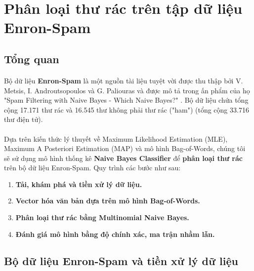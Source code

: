 \newpage
\section{Phân loại thư rác trên tập dữ liệu Enron-Spam}

\subsection{Tổng quan}
\paragraph{}{Bộ dữ liệu \textbf{Enron-Spam} là một nguồn tài liệu tuyệt vời được thu thập bởi V. Metsis, I. Androutsopoulos và G. Paliouras và được mô tả trong ấn phẩm của họ "Spam Filtering with Naive Bayes - Which Naive Bayes?" \cite{metsis2006spam}. Bộ dữ liệu chứa tổng cộng 17.171 thư rác và
16.545 thư không phải thư rác ("ham") (tổng cộng 33.716 thư điện tử).}

\paragraph{}{Dựa trên kiến thức lý thuyết về Maximum Likelihood Estimation (MLE), Maximum A Posteriori Estimation (MAP) và mô hình Bag-of-Words, chúng tôi sẽ sử dụng mô hình thống kê \textbf{Naive Bayes Classifier} để \textbf{phân loại thư rác} trên bộ dữ liệu Enron-Spam. Quy trình các bước như sau:}

\begin{enumerate}
    \item \textbf{Tải, khám phá và tiền xử lý dữ liệu.}
    \item \textbf{Vector hóa văn bản dựa trên mô hình Bag-of-Words.}
    \item \textbf{Phân loại thư rác bằng Multinomial Naive Bayes.}
    \item \textbf{Đánh giá mô hình bằng độ chính xác, ma trận nhầm lẫn.}
\end{enumerate}

\subsection{Bộ dữ liệu Enron-Spam và tiền xử lý dữ liệu}
